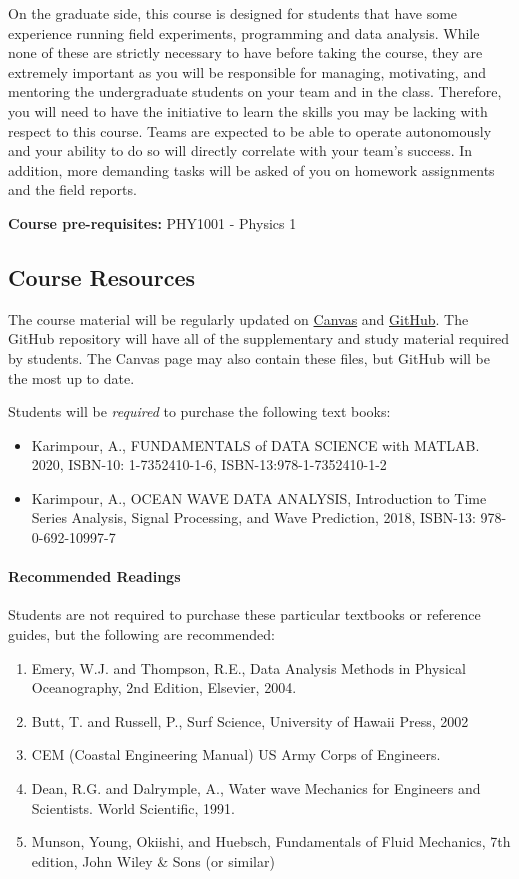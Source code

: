 \documentclass[
	letterpaper, %
	fontsize=10pt, %
	twoside=true, %
	numbers=noenddot, %
]{kaobook}
\begin{document}
On the graduate side, this course is designed for students that have some experience running field experiments, programming and data analysis.
While none of these are strictly necessary to have before taking the course, they are extremely important as you will be responsible for managing, motivating, and mentoring the undergraduate students on your team and in the class.
Therefore, you will need to have the initiative to learn the skills you may be lacking with respect to this course. 
Teams are expected to be able to operate autonomously and your ability to do so will directly correlate with your team's success.
In addition, more demanding tasks will be asked of you on homework assignments and the field reports.

\textbf{Course pre-requisites:} PHY1001 - Physics 1

\subsection*{Course Resources} \label{ssec:course_resources}
The course material will be regularly updated on \href{https://fit.instructure.com/}{Canvas} and \href{https://github.com/Legohead259/OCE2901-Material} {GitHub}. The GitHub repository will have all of the supplementary and study material required by students. The Canvas page may also contain these files, but GitHub will be the most up to date.

Students will be \emph{required} to purchase the following text books:
\begin{itemize}
    \item \footnotemark Karimpour, A., FUNDAMENTALS of DATA SCIENCE with MATLAB. 2020, ISBN-10: 1-7352410-1-6, ISBN-13:978-1-7352410-1-2
    \item Karimpour, A., OCEAN WAVE DATA ANALYSIS, Introduction to Time Series Analysis, Signal Processing, and Wave Prediction, 2018, ISBN-13: 978-0-692-10997-7
\end{itemize}

\paragraph*{Recommended Readings} Students are not required to purchase these particular textbooks or reference guides, but the following are recommended:

\begin{enumerate}
    \item Emery, W.J. and Thompson, R.E., Data Analysis Methods in Physical Oceanography, 2nd Edition, Elsevier, 2004.
    \item Butt, T. and Russell, P., Surf Science, University of Hawaii Press, 2002
    \item CEM (Coastal Engineering Manual) US Army Corps of Engineers.
    \item Dean, R.G. and Dalrymple, A., Water wave Mechanics for Engineers and Scientists. World Scientific, 1991.
    \item Munson, Young, Okiishi, and Huebsch, Fundamentals of Fluid Mechanics, 7th edition, John Wiley \& Sons (or similar)
\end{enumerate}
\end{document}
